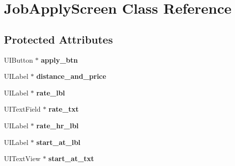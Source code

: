 \hypertarget{interface_job_apply_screen}{
\section{\-Job\-Apply\-Screen \-Class \-Reference}
\label{interface_job_apply_screen}
}
\subsection*{\-Protected \-Attributes}
\begin{DoxyCompactItemize}
\item 
\hypertarget{interface_job_apply_screen_ab752d1f19373db73447af5f31c1715fc}{
\-U\-I\-Button $\ast$ {\bfseries apply\-\_\-btn}}
\label{interface_job_apply_screen_ab752d1f19373db73447af5f31c1715fc}

\item 
\hypertarget{interface_job_apply_screen_a1e04635970d535bda8d14b5dcee656d9}{
\-U\-I\-Label $\ast$ {\bfseries distance\-\_\-and\-\_\-price}}
\label{interface_job_apply_screen_a1e04635970d535bda8d14b5dcee656d9}

\item 
\hypertarget{interface_job_apply_screen_adf247d64a4cfd0bb255dfe79ded91523}{
\-U\-I\-Label $\ast$ {\bfseries rate\-\_\-lbl}}
\label{interface_job_apply_screen_adf247d64a4cfd0bb255dfe79ded91523}

\item 
\hypertarget{interface_job_apply_screen_ac3f3808d9f851e4b663936921cad32bb}{
\-U\-I\-Text\-Field $\ast$ {\bfseries rate\-\_\-txt}}
\label{interface_job_apply_screen_ac3f3808d9f851e4b663936921cad32bb}

\item 
\hypertarget{interface_job_apply_screen_a625e895b0836762b5394566a29c023c5}{
\-U\-I\-Label $\ast$ {\bfseries rate\-\_\-hr\-\_\-lbl}}
\label{interface_job_apply_screen_a625e895b0836762b5394566a29c023c5}

\item 
\hypertarget{interface_job_apply_screen_adf1844908475e142db4e8153dfa11f48}{
\-U\-I\-Label $\ast$ {\bfseries start\-\_\-at\-\_\-lbl}}
\label{interface_job_apply_screen_adf1844908475e142db4e8153dfa11f48}

\item 
\hypertarget{interface_job_apply_screen_ac19b330ce540e66c831cd945f258edc4}{
\-U\-I\-Text\-View $\ast$ {\bfseries start\-\_\-at\-\_\-txt}}
\label{interface_job_apply_screen_ac19b330ce540e66c831cd945f258edc4}


\end{DoxyCompactItemize}
